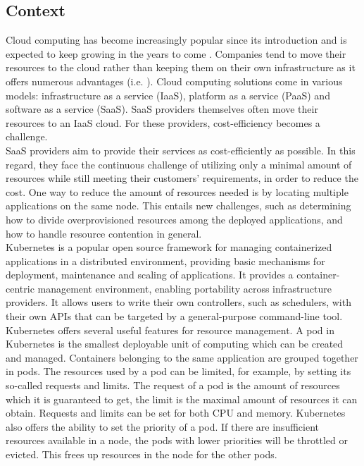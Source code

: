 \subsection{Context}
Cloud computing has become increasingly popular since its introduction and is expected to keep growing in the years to come \citep{Statista.com}. Companies tend to move their resources to the cloud rather than keeping them on their own infrastructure as it offers numerous advantages (i.e. \citep{AhmadiM.2018Caao}). Cloud computing solutions come in various models: infrastructure as a service (IaaS), platform as a service (PaaS) and software as a service (SaaS). SaaS providers themselves often move their resources to an IaaS cloud. For these providers, cost-efficiency becomes a challenge. \\

SaaS providers aim to provide their services as cost-efficiently as possible. In this regard, they face the continuous challenge of utilizing only a minimal amount of resources while still meeting their customers' requirements, in order to reduce the cost. One way to reduce the amount of resources needed is by locating multiple applications on the same node. This entails new challenges, such as determining how to divide overprovisioned resources among the deployed applications, and how to handle resource contention in general.  \\

Kubernetes is a popular open source framework for managing containerized applications in a distributed environment, providing basic mechanisms for deployment, maintenance and scaling of applications\citep{kubernetes_github}. It provides a container-centric management environment\citep{what_is_kubernetes}, enabling portability across infrastructure providers. It allows users to write their own controllers, such as schedulers, with their own APIs that can be targeted by a general-purpose command-line tool. \\


Kubernetes offers several useful features for resource management. A pod in Kubernetes is the smallest deployable unit of computing which can be created and managed\citep{pod}. Containers belonging to the same application are grouped together in pods. The resources used by a pod can be limited, for example, by setting its so-called requests and limits. The request of a pod is the amount of resources which it is guaranteed to get, the limit is the maximal amount of resources it can obtain\citep{requestlimit}. Requests and limits can be set for both CPU and memory. Kubernetes also offers the ability to set the priority of a pod. If there are insufficient resources available in a node, the pods with lower priorities will be throttled or evicted. This frees up resources in the node for the other pods.\\

